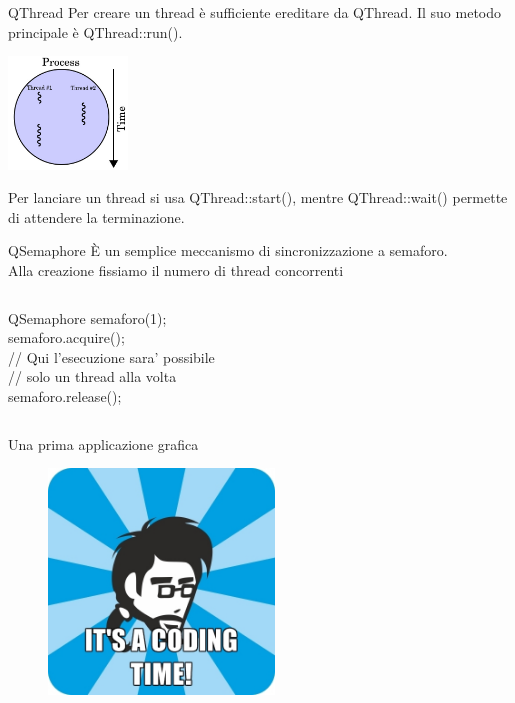 \documentclass[10pt]{beamer}
\begin{document}
\begin{frame}{QThread}
	Per creare un thread è sufficiente ereditare da {\ttfamily QThread}. Il suo metodo principale è {\ttfamily QThread::run()}.\\
	\bigskip
	
	\begin{center}
		\includegraphics[height=3cm]{images/multithread.jpg}
	\end{center}
	
	Per lanciare un thread si usa {\ttfamily QThread::start()}, mentre  {\ttfamily QThread::wait()} permette di attendere la terminazione.
\end{frame}

\lst{%
	\begin{lstlisting}[tabsize=4,basicstyle=\ttfamily]

	\end{lstlisting}
}

\begin{frame}{QSemaphore}
	È un semplice meccanismo di sincronizzazione a semaforo.\\
	Alla creazione fissiamo il numero di thread concorrenti
	\begin{columns}
		\begin{block}{}
			{\ttfamily QSemaphore semaforo(1);\\
				semaforo.acquire();\\
				// Qui l'esecuzione sara' possibile\\
				// solo un thread alla volta\\
				semaforo.release();}
		\end{block}
	\end{columns}
	
\end{frame}


\begin{frame}{Una prima applicazione grafica}
	\begin{figure}
		\includegraphics[width=6cm]{images/coding.jpg}
	\end{figure}
\end{frame}
\end{document}
